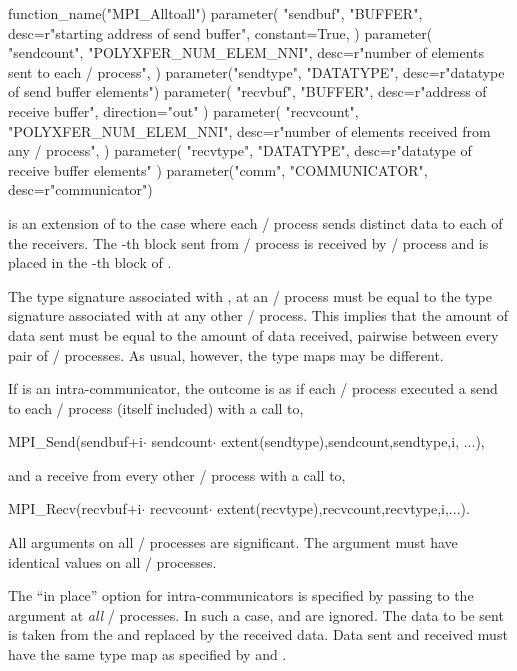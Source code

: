 \begin{mpi-binding}
    function_name("MPI_Alltoall")
    parameter(
        "sendbuf",
        "BUFFER",
        desc=r"starting address of send buffer",
        constant=True,
    )
    parameter(
        "sendcount",
        "POLYXFER_NUM_ELEM_NNI",
        desc=r"number of elements sent to each \MPI/ process",
    )
    parameter("sendtype", "DATATYPE", desc=r"datatype of send buffer elements")
    parameter(
        "recvbuf", "BUFFER", desc=r"address of receive buffer", direction="out"
    )
    parameter(
        "recvcount",
        "POLYXFER_NUM_ELEM_NNI",
        desc=r"number of elements received from any \MPI/ process",
    )
    parameter(
        "recvtype", "DATATYPE", desc=r"datatype of receive buffer elements"
    )
    parameter("comm", "COMMUNICATOR", desc=r"communicator")
\end{mpi-binding}

 is an extension of  to the case
where each \MPI/ process sends distinct data to each of the receivers.
The
-th
block sent from \MPI/ process  is received by \MPI/ process 
and is placed in the
-th
block of .

The type signature associated with ,
at an \MPI/ process must be equal to the type signature associated with
 at any other \MPI/ process.
This implies that the amount of data sent must be equal to the
amount of data received, pairwise between every pair of \MPI/ processes.
As usual, however, the type maps may be different.

If  is an intra-communicator,
the outcome is as if each \MPI/ process executed a send to each
\MPI/ process (itself included)
with a call to,
\begin{mpicodeblock}
MPI\_Send(sendbuf+i$\cdot$ sendcount$\cdot$
extent(sendtype),sendcount,sendtype,i, ...),
\end{mpicodeblock}
\noindent and a receive from every other \MPI/ process
with a call to,
\begin{mpicodeblock}
MPI\_Recv(recvbuf+i$\cdot$ recvcount$\cdot$ extent(recvtype),recvcount,recvtype,i,...).
\end{mpicodeblock}

All arguments
on all \MPI/ processes are significant.  The argument 
must have identical values on all \MPI/ processes.

The ``in place'' option for intra-communicators is specified by passing
 to the argument  at \emph{all} \MPI/ processes.
In such a case,  and  are ignored.
The data to be sent is taken from the  and replaced by the received data.
Data sent and received must have the same type map as specified by  and .

